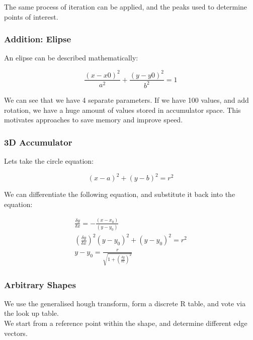 \noindent The same process of iteration can be applied, and the peaks used to determine points of interest.

\subsubsection{Addition: Elipse}

An elipse can be described mathematically:

\begin{equation}
    \frac{(x-x0)^{2}}{a^{2}}+\frac{(y-y0)^{2}}{b^{2}} = 1
\end{equation}

We can see that we have 4 separate parameters. If we have 100 values, and add rotation, we have a huge amount of values stored in accumulator space. This motivates approaches to save memory and improve speed.

\subsubsection{3D Accumulator}

Lets take the circle equation:

\begin{equation}
    (x-a)^{2} + (y-b)^{2} = r^{2} 
\end{equation}

We can differentiate the following equation, and substitute it back into the equation:

\begin{align}
    \frac{\delta y}{\delta x} = - \frac{(x-x_{0})}{(y-y_{0})} \\
    (\frac{\delta y}{\delta x})^{2}(y-y_{0})^{2}+(y-y_{0})^{2} = r^{2} \\
    y-y_{0} = \frac{r}{\sqrt{1+(\frac{\delta y}{\delta x})^{2}}}
\end{align}

\subsubsection{Arbitrary Shapes}
We use the generalised hough transform, form a discrete R table, and vote via the look up table. \\

\noindent We start from a reference point within the shape, and determine different edge vectors.